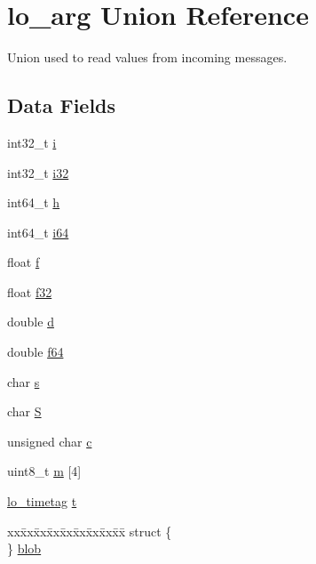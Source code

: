 \hypertarget{unionlo__arg}{\section{lo\+\_\+arg Union Reference}
\label{unionlo__arg}
}


Union used to read values from incoming messages.  


\subsection*{Data Fields}
\begin{DoxyCompactItemize}
\item 
int32\+\_\+t \hyperlink{unionlo__arg_a7eefb9548603ff68b4fbd4c4d41c648b}{i}
\item 
int32\+\_\+t \hyperlink{unionlo__arg_a07e800463dc4ec5066b01033457ca018}{i32}
\item 
int64\+\_\+t \hyperlink{unionlo__arg_a1773bb0e69aa3b137ddc26044334b2b4}{h}
\item 
int64\+\_\+t \hyperlink{unionlo__arg_afe8046a8395e9af51cc759034ccfedd5}{i64}
\item 
float \hyperlink{unionlo__arg_ad61c0f83abb077ce656b3a39d5c7e19f}{f}
\item 
float \hyperlink{unionlo__arg_a27ae2540e5e98e85826ccb7350b2ab20}{f32}
\item 
double \hyperlink{unionlo__arg_a2a690890222baa5b9971f8772cb02535}{d}
\item 
double \hyperlink{unionlo__arg_abf90442900450bb63d8d9bb4e60af4ee}{f64}
\item 
char \hyperlink{unionlo__arg_a15bbcf8284d75ad441b5cde7218548f6}{s}
\item 
char \hyperlink{unionlo__arg_ab9c6a9c09ea094d58f889ed1a5edba0b}{S}
\item 
unsigned char \hyperlink{unionlo__arg_aa2e1c99864cf46e6b9cc52fb5cb214fe}{c}
\item 
uint8\+\_\+t \hyperlink{unionlo__arg_a96d32df951c54eaff5dc67fc97a70c83}{m} \mbox{[}4\mbox{]}
\item 
\hyperlink{structlo__timetag}{lo\+\_\+timetag} \hyperlink{unionlo__arg_afc89e5569fba7a660638839366b17408}{t}
\item 
\begin{tabbing}
xx\=xx\=xx\=xx\=xx\=xx\=xx\=xx\=xx\=\kill
struct \{\\
\} \hyperlink{unionlo__arg_a1b9b898eeee0ed6c475fc1e0d311d020}{blob}\\

\end{tabbing}\end{DoxyCompactItemize}


